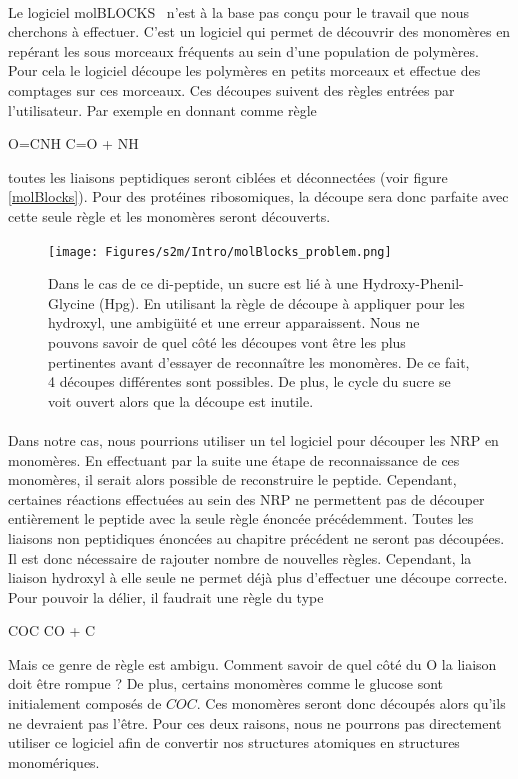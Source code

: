 \documentclass[12pt,french,twoside]{report}
\begin{document}
\paragraph{}Le logiciel molBLOCKS~\cite{ghersi_molblocks:_2014} n'est à la base pas conçu pour le travail que nous cherchons à effectuer.
C'est un logiciel qui permet de découvrir des monomères en repérant les sous morceaux fréquents au sein d'une population de polymères.
Pour cela le logiciel découpe les polymères en petits morceaux et effectue des comptages sur ces morceaux.
Ces découpes suivent des règles entrées par l'utilisateur.
Par exemple en donnant comme règle
\begin{chemmath}
  O=CNH \longrightarrow C=O + NH
\end{chemmath}
toutes les liaisons peptidiques seront ciblées et déconnectées (voir figure \ref{molBlocks}).
Pour des protéines ribosomiques, la découpe sera donc parfaite avec cette seule règle et les monomères seront découverts.

\begin{figure}[!ht]
  \begin{center}
    \texttt{[image: Figures/s2m/Intro/molBlocks\_problem.png]}
    \caption{\label{molBlocks_problem}Dans le cas de ce di-peptide, un sucre est lié à une Hydroxy-Phenil-Glycine (Hpg).
    En utilisant la règle de découpe à appliquer pour les hydroxyl, une ambigüité et une erreur apparaissent.
    Nous ne pouvons savoir de quel côté les découpes vont être les plus pertinentes avant d'essayer de reconnaître les monomères.
    De ce fait, 4 découpes différentes sont possibles.
    De plus, le cycle du sucre se voit ouvert alors que la découpe est inutile.}
  \end{center}
\end{figure}

\paragraph{}Dans notre cas, nous pourrions utiliser un tel logiciel pour découper les NRP en monomères.
En effectuant par la suite une étape de reconnaissance de ces monomères, il serait alors possible de reconstruire le peptide.
Cependant, certaines réactions effectuées au sein des NRP ne permettent pas de découper entièrement le peptide avec la seule règle énoncée précédemment.
Toutes les liaisons non peptidiques énoncées au chapitre précédent ne seront pas découpées.
Il est donc nécessaire de rajouter nombre de nouvelles règles.
Cependant, la liaison hydroxyl à elle seule ne permet déjà plus d'effectuer une découpe correcte.
Pour pouvoir la délier, il faudrait une règle du type
\begin{chemmath}
  COC \longrightarrow CO + C
\end{chemmath}
Mais ce genre de règle est ambigu.
Comment savoir de quel côté du O la liaison doit être rompue ?
De plus, certains monomères comme le glucose sont initialement composés de $COC$.
Ces monomères seront donc découpés alors qu'ils ne devraient pas l'être.
Pour ces deux raisons, nous ne pourrons pas directement utiliser ce logiciel afin de convertir nos structures atomiques en structures monomériques.
\end{document}
